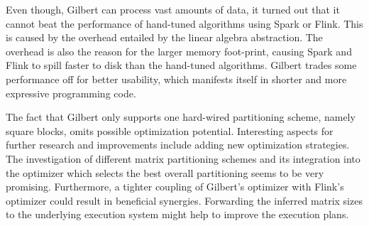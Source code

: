 Even though, Gilbert can process vast amounts of data, it turned out that it cannot beat the performance of hand-tuned algorithms using Spark or Flink. 
This is caused by the overhead entailed by the linear algebra abstraction. 
The overhead is also the reason for the larger memory foot-print, causing Spark and Flink to spill faster to disk than the hand-tuned algorithms. 
Gilbert trades some performance off for better usability, which manifests itself in shorter and more expressive programming code. 

The fact that Gilbert only supports one hard-wired partitioning scheme, namely square blocks, omits possible optimization potential. 
Interesting aspects for further research and improvements include adding new optimization strategies. 
The investigation of different matrix partitioning schemes and its integration into the optimizer which selects the best overall partitioning seems to be very promising. 
Furthermore, a tighter coupling of Gilbert's optimizer with Flink's optimizer could result in beneficial synergies. 
Forwarding the inferred matrix sizes to the underlying execution system might help to improve the execution plans.